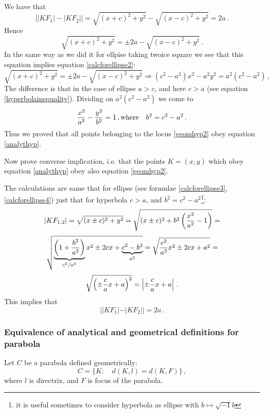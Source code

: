 \documentclass[12pt]{article}
\numberwithin{equation}{section}
\begin{document}
{We have that 
        $$
\left||KF_1|-|KF_2|\right|=
\sqrt{(x+c)^2+y^2}-
\sqrt{(x-c)^2+y^2}=2a\,.
      $$
Hence
      $$
\sqrt{(x+c)^2+y^2}=\pm 2a-
\sqrt{(x-c)^2+y^2}\,.
         $$
In the same way as we did it for ellpise taking twoice square
we see that this equation implies equation \eqref{calcforellipse2}:
             $$
\sqrt{(x+c)^2+y^2}=\pm 2a-
\sqrt{(x-c)^2+y^2}\Rightarrow
  (c^2-a^2)x^2-a^2y^2=a^2(c^2-a^2)\,,
           $$  
The difference is that in the case of ellipse $a>c$, and
 here $c>a$ (see equation \eqref{hyperbolainequality}).
Dividing on $a^2(c^2-a^2)$ we come to 
    \begin{equation}\label{ellipseanal2}
     {x^2\over a^2}-{y^2\over b^2}=1\,, {\rm where}\quad
    b^2=c^2-a^2\,.
     \end{equation}
Thus we proved that all points belonging to the 
locus \eqref{geomhyp2} obey equation
\eqref{analythyp}.

Now prove converse implication, i.e. that
the points $K=(x,y)$ which   obey equation
 \eqref{analythyp} obey also equation \eqref{geomhyp2}.

The calculations are same that for ellipse 
(see formulae \eqref{calcforellipse3},
\eqref{calcforellipse4})
just that for hyperbola $c>a$, and 
$b^2=c^2-a^2$\footnote{it is useful sometimes to consider hyperbola
as ellipse with $b\mapsto \sqrt {-1}b$}:
             $$
|KF_{1,2}|=\sqrt{(x\pm c)^2+y^2}=
\sqrt{(x\pm c)^2+b^2\left({x^2\over a^2}-1\right)}=
        $$
        $$
\sqrt{
  \underbrace{\left(1+{b^2\over a^2}\right)}_{c^2/a^2}
   x^2\pm 2cx+
    \underbrace{c^2-b^2}_{a^2}
       }=
\sqrt{{c^2\over a^2}x^2\pm 2cx+a^2}=
           $$
            \begin{equation*}\label{calcforhyp3}
   \sqrt{\left(\pm {c\over a}x+a\right)^2}
     =\left|\pm{c\over a}x+a\right|\,.
      \end{equation*}
This implies that
       $$
     ||KF_1|-|KF_2||
         =2a\,.
       $$
}


\subsubsection { Equivalence of analytical and 
geometrical definitions for parabola}

Let $C$ be a parabola   defined geometrically:
         \begin{equation*}\label{geomparabola}
C=\{K\colon\quad d(K,l)=d(K,F)\}\,,
           \end{equation*}
where $l$ is directrix, and $F$ is focus of the parabola.
\end{document}
